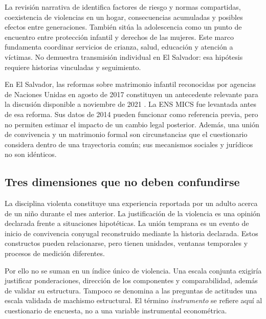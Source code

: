 \documentclass[11pt,a4paper]{article}
\begin{document}
La revisión narrativa de \citet{guedes2016} identifica factores de riesgo y
normas compartidas, coexistencia de violencias en un hogar, consecuencias
acumuladas y posibles efectos entre generaciones. También sitúa la
adolescencia como un punto de encuentro entre protección infantil y derechos
de las mujeres. Este marco fundamenta coordinar servicios de crianza,
salud, educación y atención a víctimas. No demuestra transmisión individual
en El Salvador: esa hipótesis requiere historias vinculadas y seguimiento.

En El Salvador, las reformas sobre matrimonio infantil reconocidas por agencias
de Naciones Unidas en agosto de 2017 constituyen un antecedente relevante para
la discusión disponible a noviembre de 2021 \citep{onu2017}. La ENS MICS fue
levantada antes de esa reforma. Sus datos de 2014 pueden funcionar como
referencia previa, pero no permiten estimar el impacto de un cambio legal
posterior. Además, una unión de convivencia y un matrimonio formal son
circunstancias que el cuestionario considera dentro de una trayectoria común;
sus mecanismos sociales y jurídicos no son idénticos.

\subsection{Tres dimensiones que no deben confundirse}
La disciplina violenta constituye una experiencia reportada por un adulto
acerca de un niño durante el mes anterior. La justificación de la violencia
es una opinión declarada frente a situaciones hipotéticas. La unión temprana
es un evento de inicio de convivencia conyugal reconstruido mediante la historia declarada. Estos constructos
pueden relacionarse, pero tienen unidades, ventanas temporales y procesos de
medición diferentes.

Por ello no se suman en un índice único de violencia. Una escala conjunta
exigiría justificar ponderaciones, dirección de los componentes y comparabilidad,
además de validar su estructura. Tampoco se denomina a las preguntas de actitudes
una escala validada de machismo estructural. El término \emph{instrumento} se
refiere aquí al cuestionario de encuesta, no a una variable instrumental
econométrica.


\end{document}
